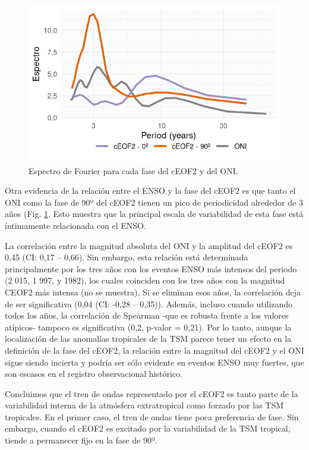 \documentclass[12pt,oneside,a4paper]{reedthesis}
\begin{document}
\begin{figure}

{\centering \includegraphics{figures/20-ceofs/fft-ceof-era5-1} 

}

\caption{Espectro de Fourier para cada fase del cEOF2 y del ONI.}\label{fig:fft-ceof-era5}
\end{figure}



Otra evidencia de la relación entre el ENSO y la fase del cEOF2 es que tanto el ONI como la fase de 90º del cEOF2 tienen un pico de periodicidad alrededor de 3 años (Fig. \ref{fig:fft-ceof-era5}.
Esto muestra que la principal escala de variabilidad de esta fase está íntimamente relacionada con el ENSO.

La correlación entre la magnitud absoluta del ONI y la amplitud del cEOF2 es 0,45 (CI: 0,17 -- 0,66).
Sin embargo, esta relación está determinada principalmente por los tres años con los eventos ENSO más intensos del periodo (2 015, 1 997, y 1982), los cuales coinciden con los tres años con la magnitud CEOF2 más intensa (no se muestra).
Si se eliminan esos años, la correlación deja de ser significativa (0,04 (CI: -0,28 -- 0,35)).
Además, incluso cuando utilizando todos los años, la correlación de Spearman -que es robusta frente a los valores atípicos- tampoco es significativa (0,2, p-valor = 0,21).
Por lo tanto, aunque la localización de las anomalías tropicales de la TSM parece tener un efecto en la definición de la fase del cEOF2, la relación entre la magnitud del cEOF2 y el ONI sigue siendo incierta y podría ser sólo evidente en eventos ENSO muy fuertes, que son escasos en el registro observacional histórico.

Concluimos que el tren de ondas representado por el cEOF2 es tanto parte de la variabilidad interna de la atmósfera extratropical como forzado por las TSM tropicales.
En el primer caso, el tren de ondas tiene poca preferencia de fase.
Sin embargo, cuando el cEOF2 es excitado por la variabilidad de la TSM tropical, tiende a permanecer fijo en la fase de 90º.
\end{document}
